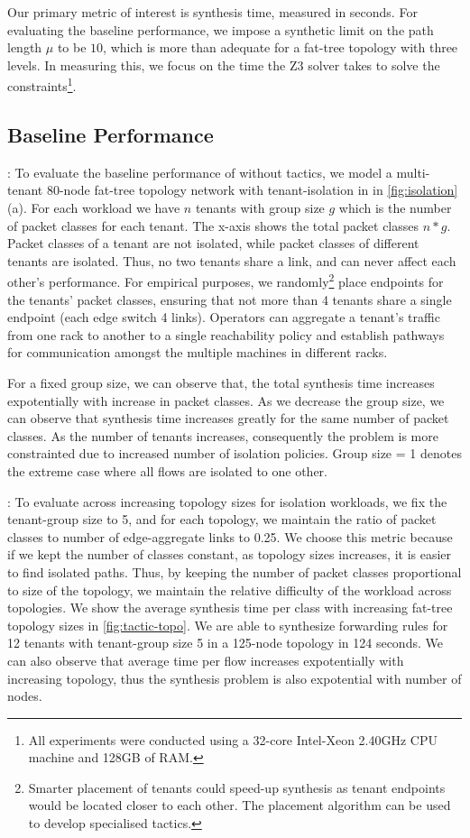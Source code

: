 Our primary metric of interest is synthesis time, measured in
seconds. For evaluating the baseline performance, we impose a
synthetic limit on the path length $\mu$ to be $10$, which is more than adequate 
for a fat-tree topology with three levels. 
In measuring this, we focus on the time the Z3 solver takes
to solve the constraints\footnote{All experiments were conducted using a
 32-core Intel-Xeon 2.40GHz CPU machine and
128GB of RAM.}.
\subsection{Baseline Performance} \label{sec:baselineeval} 
: To evaluate the baseline performance of \Name without tactics, we model a multi-tenant
80-node fat-tree topology network with   
tenant-isolation in in \cref{fig:isolation}(a). 
For each workload we have $n$ tenants with group size $g$ which 
is the number of packet classes for each tenant. The x-axis shows the total packet classes $n*g$. 
Packet classes of a tenant are not isolated, while packet classes
of different tenants are isolated. Thus, no two tenants share a link, and can never affect
each other's performance. For empirical purposes, 
we randomly\footnote{
	Smarter placement of tenants could speed-up synthesis as tenant endpoints would
	be located closer to each other. The placement algorithm can be used to develop specialised tactics.}
  place endpoints for the tenants' packet classes, ensuring that not more than 4 tenants share a single endpoint
  (each edge switch 4 links). 
   Operators can aggregate a tenant's traffic from one rack to
another to a single reachability policy and establish pathways for communication amongst the multiple
machines in different racks. 

For a fixed group size, we can observe that,
the total synthesis time increases expotentially with increase in packet classes.
 As we decrease the group size,
 we can observe that synthesis time increases greatly for the same number of packet classes.
 As the number of tenants increases, consequently the problem is more constrainted 
  due to increased number of isolation policies. 
 Group size = 1 denotes the extreme case where all flows are isolated to one other. 

:
 To evaluate \Name across increasing topology sizes for isolation workloads, 
we fix the tenant-group size to 5, and for each topology, we maintain
 the ratio of packet classes to number of edge-aggregate links to 0.25. 
We choose this metric because if we kept the number of classes constant,
as topology sizes increases, it is easier to find isolated paths. Thus, by keeping
the number of packet classes proportional to size of the topology, we maintain
the relative difficulty of the workload across topologies. 
We show the average synthesis time per class with
 increasing fat-tree topology sizes in \cref{fig:tactic-topo}. 
 We are able to synthesize forwarding rules for 
 12 tenants with tenant-group size 5 in a 125-node topology in 124 seconds. 
  We can also observe that average time per flow increases expotentially 
  with increasing topology, 
  thus the synthesis problem is also expotential with number of nodes.
  
